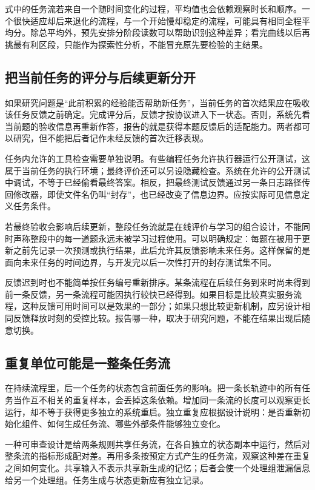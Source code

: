 式中的任务流若来自一个随时间变化的过程，平均值也会依赖观察时长和顺序。一个很快适应却后来退化的流程，与一个开始慢却稳定的流程，可能具有相同全程平均分。除总平均外，预先安排分阶段读数可以帮助识别这种差异；看完曲线以后再挑最有利区段，只能作为探索性分析，不能冒充原先要检验的主结果。

\subsection{把当前任务的评分与后续更新分开}

如果研究问题是“此前积累的经验能否帮助新任务”，当前任务的首次结果应在吸收该任务反馈之前确定。完成评分后，反馈才按协议进入下一状态。否则，系统先看当前题的验收信息再重新作答，报告的就是获得本题反馈后的适配能力。两者都可以研究，但不能把后者记作未经反馈的首次迁移表现。

任务内允许的工具检查需要单独说明。有些编程任务允许执行器运行公开测试，这属于当前任务的执行环境；最终评价还可以另设隐藏检查。系统在允许的公开测试中调试，不等于已经偷看最终答案。相反，把最终测试反馈通过另一条日志路径传回修改器，即使文件名仍叫“封存”，也已经改变了信息边界。应按实际可见信息定义任务条件。

若最终验收会影响后续更新，整段任务流就是在线评价与学习的组合设计，不能同时声称整段中的每一道题永远未被学习过程使用。可以明确规定：每题在被用于更新之前先记录一次预测或执行结果，此后允许其反馈影响未来任务。这样保留的是面向未来任务的时间边界，与开发完以后一次性打开的封存测试集不同。

反馈迟到时也不能简单按任务编号重新排序。某条流程在后续任务到来时尚未得到前一条反馈，另一条流程可能因执行较快已经得到。如果目标是比较真实服务流程，这种反馈可用时间可以是效果的一部分；如果只想比较更新机制，应另设计相同反馈释放时刻的受控比较。报告哪一种，取决于研究问题，不能在结果出现后随意切换。

\subsection{重复单位可能是一整条任务流}

在持续流程里，后一个任务的状态包含前面任务的影响。把一条长轨迹中的所有任务当作互不相关的重复样本，会丢掉这条依赖。增加同一条流的长度可以观察更长运行，却不等于获得更多独立的系统重启。独立重复应根据设计说明：是否重新初始化组件、如何生成任务流、哪些外部条件能够独立变化。

一种可审查设计是给两条规则共享任务流，在各自独立的状态副本中运行，然后对整条流的指标形成配对差。再用多条按预定方式产生的任务流，观察这种差在重复之间如何变化。共享输入不表示共享新生成的记忆；后者会使一个处理组泄漏信息给另一个处理组。任务生成与状态更新应有独立记录。

